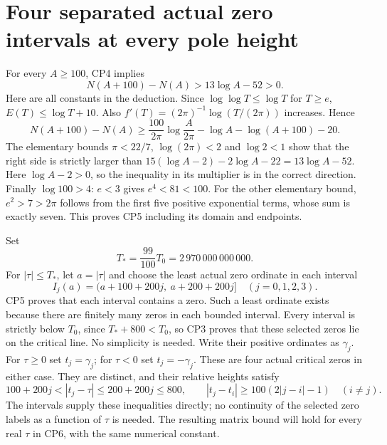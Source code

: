 \documentclass[11pt]{article}
\begin{document}
\section{Four separated actual zero intervals at every pole height}
For every $A\ge100$, CP4 implies
\begin{equation}
N(A+100)-N(A)>13\log A-52>0.
\tag{CP5}
\end{equation}
Here are all constants in the deduction. Since
$\log\log T\le\log T$ for $T\ge e$,
$E(T)\le\log T+10$. Also
$f'(T)=(2\pi)^{-1}\log(T/(2\pi))$ increases. Hence
\[
N(A+100)-N(A)
\ge\frac{100}{2\pi}\log\frac{A}{2\pi}
                 -\log A-\log(A+100)-20 .
\]
The elementary bounds $\pi<22/7$, $\log(2\pi)<2$ and
$\log2<1$ show that the right side is strictly larger than
$15(\log A-2)-2\log A-22=13\log A-52$.
Here $\log A-2>0$, so the inequality in its multiplier is
in the correct direction. Finally $\log100>4$:
$e<3$ gives $e^4<81<100$. For the other elementary bound,
$e^2>7>2\pi$ follows from the first five positive exponential
terms, whose sum is exactly seven. This proves CP5 including
its domain and endpoints.

Set
\begin{equation}
T_*=\frac{99}{100}T_0=2\,970\,000\,000\,000 .
\tag{CP6}
\end{equation}
For $|\tau|\le T_*$, let $a=|\tau|$ and choose the least
actual zero ordinate in each interval
\begin{equation}
I_j(a)=(a+100+200j,\ a+200+200j]\quad(j=0,1,2,3).
\tag{CP7}
\end{equation}
CP5 proves that each interval contains a zero. Such a least
ordinate exists because there are finitely many zeros in
each bounded interval. Every interval is strictly below
$T_0$, since $T_*+800<T_0$, so CP3 proves that these selected
zeros lie on the critical line. No simplicity is needed.
Write their positive ordinates as $\gamma_j$. For $\tau\ge0$
set $t_j=\gamma_j$; for $\tau<0$ set $t_j=-\gamma_j$.
These are four actual critical zeros in either case.
They are distinct, and their relative heights satisfy
\begin{equation}
100+200j<|t_j-\tau|\le200+200j\le800,\qquad
|t_j-t_i|\ge100(2|j-i|-1)\quad(i\ne j).
\tag{CP8}
\end{equation}
The intervals supply these inequalities directly; no continuity
of the selected zero labels as a function of $\tau$ is needed.
The resulting matrix bound will hold for every real $\tau$
in CP6, with the same numerical constant.
\end{document}
